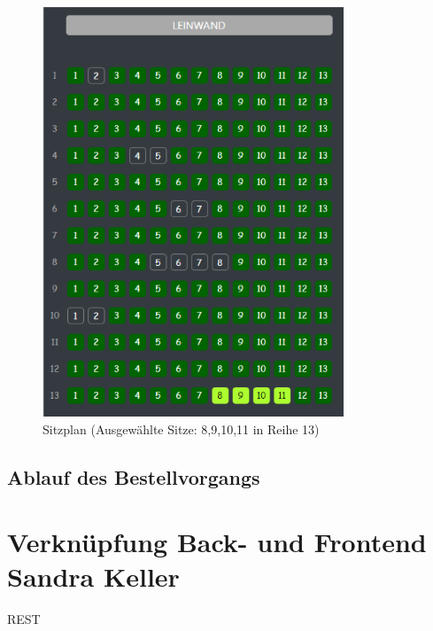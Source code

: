 	\begin{figure}[H]
		\centering 
		\includegraphics[width=9cm]{img/sitzplan.png}
		\captionsetup{format=hang}
		\caption[Sitzplan]{\label{fig:sitzplan} Sitzplan (Ausgewählte Sitze: 8,9,10,11 in Reihe 13)}
	\end{figure}

	\subsection{Ablauf des Bestellvorgangs}
	
	
	\section[Verknüpfung Back- und Frontend]{Verknüpfung Back- und Frontend {\hfill \normalsize Sandra Keller}}
	REST

	
